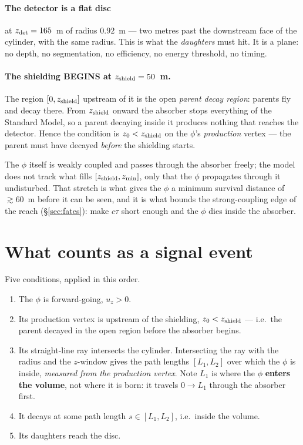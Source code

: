 \documentclass[11pt]{article}
\begin{document}
\paragraph{The detector is a flat disc} at $z_{\rm det}=165$~m of radius
$0.92$~m --- two metres past the downstream face of the cylinder, with the same
radius. This is what the \emph{daughters} must hit. It is a plane: no depth, no
segmentation, no efficiency, no energy threshold, no timing.

\paragraph{The shielding BEGINS at $z_{\rm shield}=50$~m.} The region
$[0,z_{\rm shield}]$ upstream of it is the open \emph{parent decay region}:
parents fly and decay there. From $z_{\rm shield}$ onward the absorber stops
everything of the Standard Model, so a parent decaying inside it produces
nothing that reaches the detector. Hence the condition is
$z_0<z_{\rm shield}$ on the $\phi$'s \emph{production} vertex --- the parent
must have decayed \emph{before} the shielding starts.

The $\phi$ itself is weakly coupled and passes through the absorber freely; the
model does not track what fills $[z_{\rm shield},z_{\min}]$, only that the
$\phi$ propagates through it undisturbed. That stretch is what gives the $\phi$
a minimum survival distance of $\gtrsim60$~m before it can be seen, and it is
what bounds the strong-coupling edge of the reach (\S\ref{sec:fates}): make
$c\tau$ short enough and the $\phi$ dies inside the absorber.

\section{What counts as a signal event}

Five conditions, applied in this order.

\begin{enumerate}
\item The $\phi$ is forward-going, $u_z>0$.
\item Its production vertex is upstream of the shielding,
  $z_0<z_{\rm shield}$ --- i.e.\ the parent decayed in the open region before
  the absorber begins.
\item Its straight-line ray intersects the cylinder. Intersecting the ray with
  the radius and the $z$-window gives the path lengths $[L_1,L_2]$ over which
  the $\phi$ is inside, \emph{measured from the production vertex}. Note $L_1$
  is where the $\phi$ \textbf{enters the volume}, not where it is born: it
  travels $0\to L_1$ through the absorber first.
\item It decays at some path length $s\in[L_1,L_2]$, i.e.\ inside the volume.
\item Its daughters reach the disc.
\end{enumerate}
\end{document}
